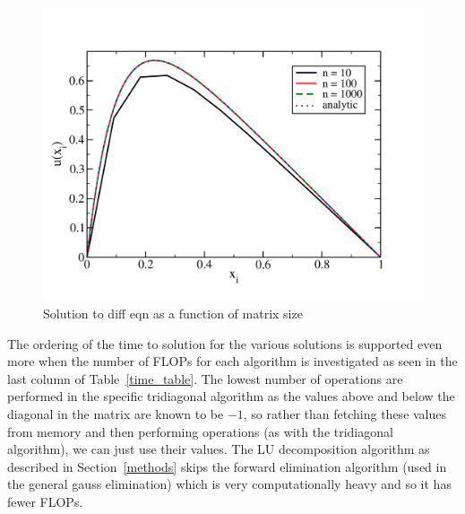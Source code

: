 \documentclass[prc,amsmath,twocolumn,superscriptaddress]{revtex4}
\begin{document}
\begin{figure}[b]
\includegraphics[scale=0.33]{output}
\caption{Solution to diff eqn as a function of matrix size}
\label{output}
\end{figure}

The ordering of the time to solution for the various solutions is supported even more when the number of FLOPs for each algorithm is investigated as seen in the last column of Table~\ref{time_table}. The lowest number of operations are performed in the specific tridiagonal algorithm as the values above and below the diagonal in the matrix are known to be $-1$, so rather than fetching these values from memory and then performing operations (as with the tridiagonal algorithm), we can just use their values. The LU decomposition algorithm as described in Section~\ref{methods} skips the forward elimination algorithm (used in the general gauss elimination) which is very computationally heavy and so it has fewer FLOPs. \\

\end{document}
